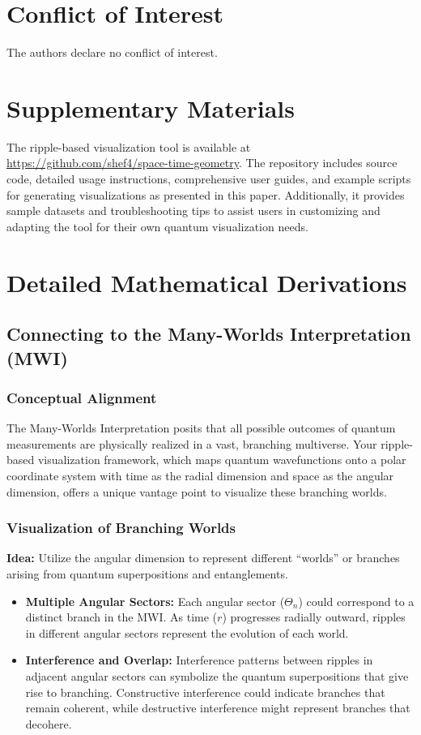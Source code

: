 \documentclass[12pt]{article}
\begin{document}
\section*{Conflict of Interest}
The authors declare no conflict of interest.

\section*{Supplementary Materials}
The ripple-based visualization tool is available at \url{https://github.com/shef4/space-time-geometry}. The repository includes source code, detailed usage instructions, comprehensive user guides, and example scripts for generating visualizations as presented in this paper. Additionally, it provides sample datasets and troubleshooting tips to assist users in customizing and adapting the tool for their own quantum visualization needs.

\appendix
\section{Detailed Mathematical Derivations}
\label{appendix:A}

\subsection{Connecting to the Many-Worlds Interpretation (MWI)}
\subsubsection{Conceptual Alignment}
The Many-Worlds Interpretation posits that all possible outcomes of quantum measurements are physically realized in a vast, branching multiverse. Your ripple-based visualization framework, which maps quantum wavefunctions onto a polar coordinate system with time as the radial dimension and space as the angular dimension, offers a unique vantage point to visualize these branching worlds.

\subsubsection{Visualization of Branching Worlds}
\textbf{Idea:} Utilize the angular dimension to represent different “worlds” or branches arising from quantum superpositions and entanglements.

\begin{itemize}
    \item \textbf{Multiple Angular Sectors:} Each angular sector (\(\Theta_n\)) could correspond to a distinct branch in the MWI. As time (\(r\)) progresses radially outward, ripples in different angular sectors represent the evolution of each world.
    
    \item \textbf{Interference and Overlap:} Interference patterns between ripples in adjacent angular sectors can symbolize the quantum superpositions that give rise to branching. Constructive interference could indicate branches that remain coherent, while destructive interference might represent branches that decohere.
\end{itemize}
\end{document}
